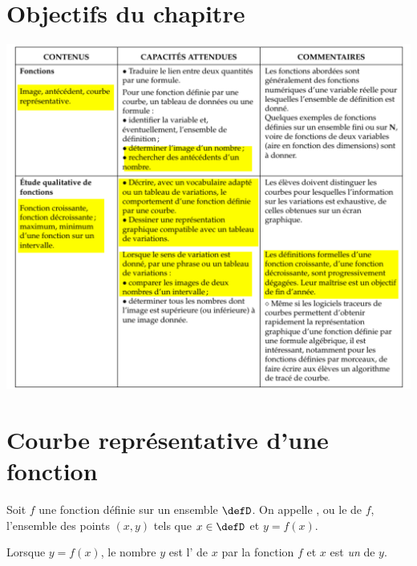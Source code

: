 
\section{Objectifs du chapitre}

\includegraphics[width=\linewidth]{BO_fonctions_graphique}



\section{Courbe représentative d'une fonction}


\begin{definition}
Soit $f$ une fonction définie sur un ensemble $\defD$.
    On appelle , ou le  de $f$, l'ensemble des points $(x,y)$ tels que $x\in\defD$ et $y=f(x)$.

    Lorsque \( y=f(x)\), le nombre \( y\) est l' de \( x\) par la fonction \( f\) et \( x\) est \emph{un}  de \( y\).
\end{definition}

